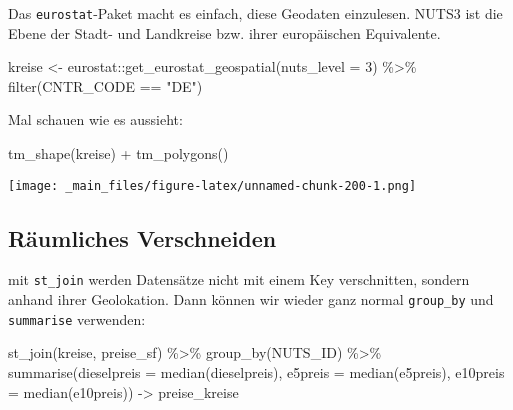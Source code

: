 \documentclass[
  ngerman,
]{article}
\newenvironment{Shaded}{\begin{snugshade}}{\end{snugshade}}
\newcommand{\AttributeTok}[1]{\textcolor[rgb]{0.77,0.63,0.00}{#1}}
\newcommand{\DecValTok}[1]{\textcolor[rgb]{0.00,0.00,0.81}{#1}}
\newcommand{\FunctionTok}[1]{\textcolor[rgb]{0.00,0.00,0.00}{#1}}
\newcommand{\NormalTok}[1]{#1}
\newcommand{\OtherTok}[1]{\textcolor[rgb]{0.56,0.35,0.01}{#1}}
\newcommand{\SpecialCharTok}[1]{\textcolor[rgb]{0.00,0.00,0.00}{#1}}
\newcommand{\StringTok}[1]{\textcolor[rgb]{0.31,0.60,0.02}{#1}}
\begin{document}
Das \texttt{eurostat}-Paket macht es einfach, diese Geodaten einzulesen. NUTS3 ist die Ebene der Stadt- und Landkreise bzw. ihrer europäischen Equivalente.

\begin{Shaded}
\begin{Highlighting}[]
\NormalTok{kreise }\OtherTok{\textless{}{-}}\NormalTok{ eurostat}\SpecialCharTok{::}\FunctionTok{get\_eurostat\_geospatial}\NormalTok{(}\AttributeTok{nuts\_level =} \DecValTok{3}\NormalTok{) }\SpecialCharTok{\%\textgreater{}\%}
  \FunctionTok{filter}\NormalTok{(CNTR\_CODE }\SpecialCharTok{==} \StringTok{"DE"}\NormalTok{)}
\end{Highlighting}
\end{Shaded}

Mal schauen wie es aussieht:

\begin{Shaded}
\begin{Highlighting}[]
\FunctionTok{tm\_shape}\NormalTok{(kreise) }\SpecialCharTok{+}
  \FunctionTok{tm\_polygons}\NormalTok{()}
\end{Highlighting}
\end{Shaded}

\texttt{[image: \_main\_files/figure-latex/unnamed-chunk-200-1.png]}

\hypertarget{ruxe4umliches-verschneiden}{%
\subsection{Räumliches Verschneiden}\label{ruxe4umliches-verschneiden}}

mit \texttt{st\_join} werden Datensätze nicht mit einem Key verschnitten, sondern anhand ihrer Geolokation. Dann können wir wieder ganz normal \texttt{group\_by} und \texttt{summarise} verwenden:

\begin{Shaded}
\begin{Highlighting}[]
\FunctionTok{st\_join}\NormalTok{(kreise, preise\_sf) }\SpecialCharTok{\%\textgreater{}\%}
  \FunctionTok{group\_by}\NormalTok{(NUTS\_ID) }\SpecialCharTok{\%\textgreater{}\%}
  \FunctionTok{summarise}\NormalTok{(}\AttributeTok{dieselpreis =} \FunctionTok{median}\NormalTok{(dieselpreis),}
            \AttributeTok{e5preis     =} \FunctionTok{median}\NormalTok{(e5preis),}
            \AttributeTok{e10preis    =} \FunctionTok{median}\NormalTok{(e10preis)) }\OtherTok{{-}\textgreater{}}\NormalTok{ preise\_kreise}
\end{Highlighting}
\end{Shaded}
\end{document}
